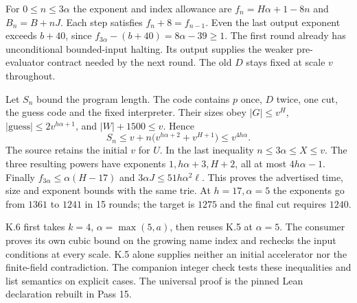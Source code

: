 For $0\le n\le3\alpha$ the exponent and index allowance are $f_n=H\alpha+1-8n$ and $B_n=B+nJ$. Each step satisfies $f_n+8=f_{n-1}$. Even the last output exponent exceeds $b+40$, since $f_{3\alpha}-(b+40)=8\alpha-39\ge1$. The first round already has unconditional bounded-input halting. Its output supplies the weaker pre-evaluator contract needed by the next round. The old $D$ stays fixed at scale $v$ throughout.

Let $S_n$ bound the program length. The code contains $p$ once, $D$ twice, one cut, the guess code and the fixed interpreter. Their sizes obey $|G|\le v^H$, $|\mathrm{guess}|\le 2v^{h\alpha+1}$, and $|W|+1500\le v$. Hence
\[
 S_n\le v+n\big(v^{h\alpha+2}+v^{H+1}\big)\le v^{4h\alpha}.
\]
The source retains the initial $v$ for $U$. In the last inequality $n\le3\alpha\le X\le v$. The three resulting powers have exponents $1,h\alpha+3,H+2$, all at most $4h\alpha-1$. Finally $f_{3\alpha}\le\alpha(H-17)$ and $3\alpha J\le51h\alpha^2\ell$. This proves the advertised time, size and exponent bounds with the same trie. At $h=17,\alpha=5$ the exponents go from $1361$ to $1241$ in 15 rounds; the target is $1275$ and the final cut requires $1240$.

K.6 first takes $k=4$, $\alpha=\max(5,a)$, then reuses K.5 at $\alpha=5$. The consumer proves its own cubic bound on the growing name index and rechecks the input conditions at every scale. K.5 alone supplies neither an initial accelerator nor the finite-field contradiction. The companion integer check tests these inequalities and list semantics on explicit cases. The universal proof is the pinned Lean declaration rebuilt in Pass 15.
